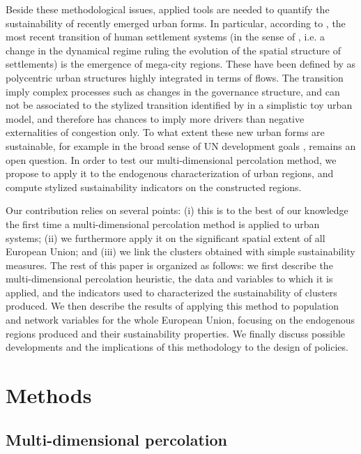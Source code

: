 \documentclass{jimis-en}
\begin{document}
Beside these methodological issues, applied tools are needed to quantify the sustainability of recently emerged urban forms. In particular, according to \cite{lenechet2017peupler}, the most recent transition of human settlement systems (in the sense of \cite{sanders2017peupler}, i.e. a change in the dynamical regime ruling the evolution of the spatial structure of settlements) is the emergence of mega-city regions. These have been defined by \cite{hall2006polycentric} as polycentric urban structures highly integrated in terms of flows. The transition imply complex processes such as changes in the governance structure, and can not be associated to the stylized transition identified by \cite{louf2013modeling} in a simplistic toy urban model, and therefore has chances to imply more drivers than negative externalities of congestion only. To what extent these new urban forms are sustainable, for example in the broad sense of UN development goals \citep{komiyama2006sustainability}, remains an open question. In order to test our multi-dimensional percolation method, we propose to apply it to the endogenous characterization of urban regions, and compute stylized sustainability indicators on the constructed regions.


Our contribution relies on several points: (i) this is to the best of our knowledge the first time a multi-dimensional percolation method is applied to urban systems; (ii) we furthermore apply it on the significant spatial extent of all European Union; and (iii) we link the clusters obtained with simple sustainability measures. The rest of this paper is organized as follows: we first describe the multi-dimensional percolation heuristic, the data and variables to which it is applied, and the indicators used to characterized the sustainability of clusters produced. We then describe the results of applying this method to population and network variables for the whole European Union, focusing on the endogenous regions produced and their sustainability properties. We finally discuss possible developments and the implications of this methodology to the design of policies.



\section{Methods}




\subsection{Multi-dimensional percolation}
\end{document}
